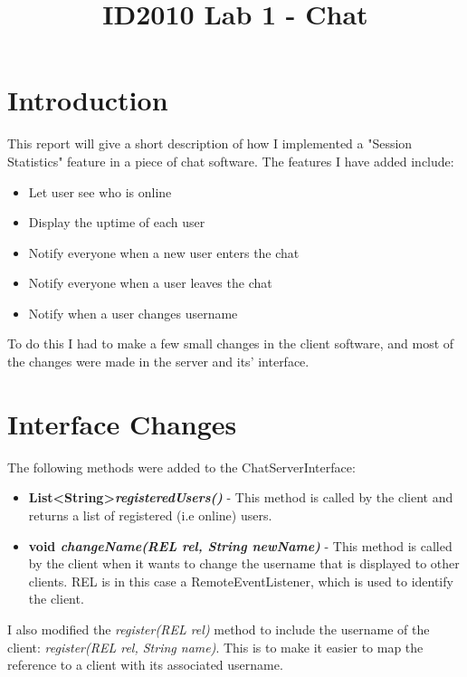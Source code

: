 \documentclass[conference, a4paper]{IEEEtran}
\begin{document}
\title{ID2010 Lab 1 - Chat}


\author{
}
\maketitle

\IEEEpeerreviewmaketitle


\section{Introduction}
This report will give a short description of how I implemented a "Session Statistics" feature in a piece of chat software. The features I have added include:
\begin{itemize}
	\item Let user see who is online
	\item Display the uptime of each user
	\item Notify everyone when a new user enters the chat
	\item Notify everyone when a user leaves the chat
	\item Notify when a user changes username
\end{itemize}
To do this I had to make a few small changes in the client software, and most of the changes were made in the server and its' interface.

\section{Interface Changes}
The following methods were added to the ChatServerInterface:
\begin{itemize}
	\item \textbf{List\textless String\textgreater \space \textit{registeredUsers()}} - This method is called by the client and returns a list of registered (i.e online) users.
	\item \textbf{void \textit{changeName(REL rel, String newName)}} - This method is called by the client when it wants to change the username that is displayed to other clients. REL is in this case a RemoteEventListener, which is used to identify the client.
\end{itemize}

I also modified the \textit{register(REL rel)} method to include the username of the client: \textit{register(REL rel, String name)}. This is to make it easier to map the reference to a client with its associated username.
\end{document}
